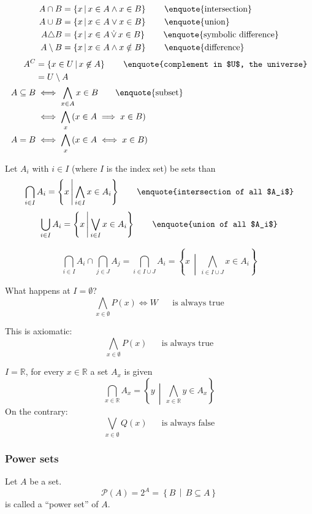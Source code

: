 \documentclass[a4paper,landscape,twocolumn]{article}
\newcommand\setdef[2]{\left\{#1\,\middle|\,#2\right\}}
\newcommand\mathspace{\hspace{20pt}}
\begin{document}
\begin{align*}
  A \cap B &= \setdef{x}{x \in A \land x \in B} \mathspace \text{\enquote{intersection}} \\
  A \cup B &= \setdef{x}{x \in A \lor x \in B} \mathspace \text{\enquote{union}} \\
  A \triangle B &= \setdef{x}{x \in A \,\dot\lor\, x \in B} \mathspace \text{\enquote{symbolic difference}} \\
  A \setminus B &= \setdef{x}{x \in A \land x \notin B} \mathspace \text{\enquote{difference}}
\end{align*}
\begin{align*}
  A^C &= \setdef{x \in U}{x \not\in A} \mathspace \text{\enquote{complement in $U$, the universe}} \\
      &= U \setminus A \\
  A \subseteq B &\iff \bigwedge_{x \in A} x \in B \mathspace \text{\enquote{subset}} \\
                &\iff \bigwedge_{x} \left(x \in A \implies x \in B\right) \\
  A = B &\iff \bigwedge_x \left(x \in A \iff x \in B\right)
\end{align*}

Let $A_i$ with $i \in I$ (where $I$ is the index set) be sets than
\[ \bigcap_{i \in I} A_i = \setdef{x}{\bigwedge_{i \in I} x \in A_i} \mathspace \text{\enquote{intersection of all $A_i$}} \]
\[ \bigcup_{i \in I} A_i = \setdef{x}{\bigvee_{i \in I} x \in A_i} \mathspace \text{\enquote{union of all $A_i$}} \]

\[
    \bigcap_{i \in I} A_i \cap \bigcap_{j \in J} A_j
    = \bigcap_{i \in I \cup J} A_i
    = \setdef{x}{\bigwedge_{i \in I \cup J} x \in A_i}
\]

What happens at $I = \emptyset$?
\[ \bigwedge_{x \in \emptyset} P(x) \iff W \mathspace\text{is always true} \]

This is axiomatic:
\[ \bigwedge_{x \in \emptyset} P(x) \mathspace \text{is always true} \]

$I = \mathbb{R}$, for every $x \in \mathbb{R}$ a set $A_x$ is given
\[ \bigcap_{x \in \mathbb{R}} A_x = \setdef{y}{\bigwedge_{x \in \mathbb{R}} y \in A_x} \]
On the contrary:
\[ \bigvee_{x \in \emptyset} Q(x) \mathspace\text{is always false} \]

\subsubsection{Power sets}
%
Let $A$ be a set.
\[ \mathcal P(A) = 2^A = \setdef{B}{B \subseteq A} \]
is called a \enquote{power set} of $A$.
\end{document}
